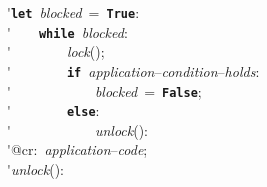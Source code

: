 \'\>\texttt{\textbf{let}}~\textit{blocked}~=~\texttt{\textbf{True}}:\\

\'\>~~~~\texttt{\textbf{while}}~\textit{blocked}:\\

\'\>~~~~~~~~\textit{lock}();\\

\'\>~~~~~~~~\texttt{\textbf{if}}~\textit{application}--\textit{condition}--\textit{holds}:\\

\'\>~~~~~~~~~~~~\textit{blocked}~=~\texttt{\textbf{False}};\\

\'\>~~~~~~~~\texttt{\textbf{else}}:\\

\'\>~~~~~~~~~~~~\textit{unlock}():\\

\'\>@cr:~\textit{application}--\textit{code};\\

\'\>\textit{unlock}():